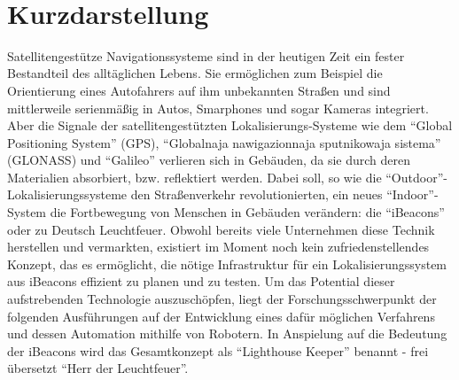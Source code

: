 \maketitle 
\newpage\thispagestyle{empty}~
\newpage

\chapter*{Kurzdarstellung}
Satellitengestütze Navigationssysteme sind in der heutigen Zeit ein fester Bestandteil des alltäglichen Lebens. Sie ermöglichen zum Beispiel die Orientierung eines Autofahrers auf ihm unbekannten Straßen und sind mittlerweile serienmäßig in Autos, Smarphones und sogar Kameras integriert. Aber die Signale der satellitengestützten Lokalisierungs-Systeme wie dem "`Global Positioning System"' (GPS), "`Globalnaja nawigazionnaja sputnikowaja sistema"' (GLONASS) und "`Galileo"' verlieren sich in Gebäuden, da sie durch deren Materialien absorbiert, bzw. reflektiert werden. Dabei soll, so wie die "`Outdoor"'-Lokalisierungssysteme den Straßenverkehr revolutionierten, ein neues "`Indoor"'-System die Fortbewegung von Menschen in Gebäuden verändern: die "`iBeacons"' oder zu Deutsch Leuchtfeuer. Obwohl bereits viele Unternehmen diese Technik herstellen und vermarkten, existiert im Moment noch kein zufriedenstellendes Konzept, das es ermöglicht, die nötige Infrastruktur für ein Lokalisierungssystem aus iBeacons effizient zu planen und zu testen. Um das Potential dieser aufstrebenden Technologie auszuschöpfen, liegt der Forschungsschwerpunkt der folgenden Ausführungen auf der Entwicklung eines dafür möglichen Verfahrens und dessen Automation mithilfe von Robotern. In Anspielung auf die Bedeutung der iBeacons wird das Gesamtkonzept als "`Lighthouse Keeper"' benannt - frei übersetzt "`Herr der Leuchtfeuer"'.